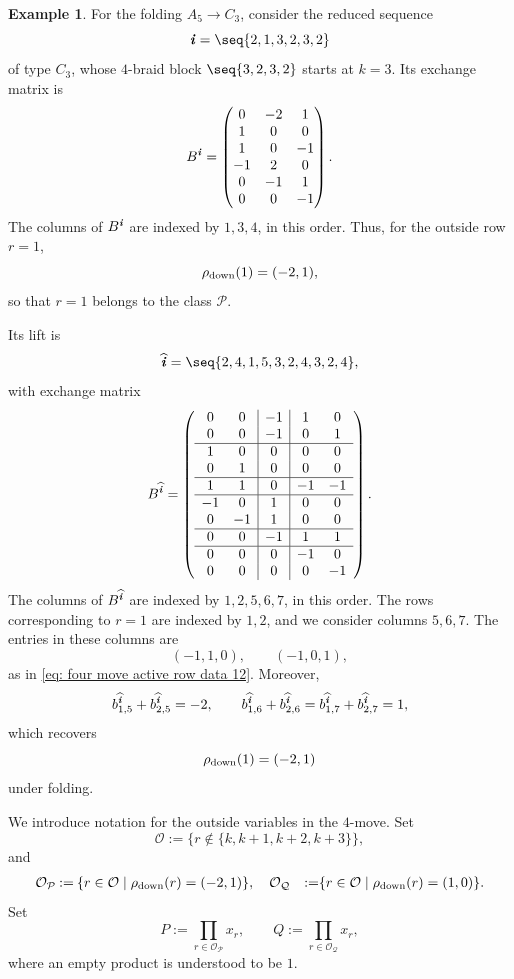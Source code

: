 \documentclass[12pt, leqno]{amsart}
\numberwithin{equation}{section}
\theoremstyle{plain}
\theoremstyle{definition}
\newtheorem{example}[lemma]{Example}
\newcommand{\seteq}{\mathbin{:=}}
\newcommand{\ii}{ \textbf{\textit{i}}}
\newcommand{\hii}{{\widehat{\ii}}}
\newcommand{\calO}{\mathcal{O}}
\newcommand{\calP}{\mathcal{P}}
\newcommand{\calQ}{\mathcal{Q}}
\begin{document}
\begin{example}\label{ex: folding and fiber}
For the folding $A_5\longrightarrow C_3$, consider the reduced sequence
\[
\ii=\seq{2,1,3,2,3,2}
\]
of type $C_3$, whose $4$-braid block $\seq{3,2,3,2}$ starts at $k=3$.
Its exchange matrix is
\[
B^\ii=
\begin{pmatrix}
0&-2&1\\
1&0&0\\
1&0&-1\\
-1&2&0\\
0&-1&1\\
0&0&-1
\end{pmatrix}.
\]
The columns of $B^\ii$ are indexed by $1,3,4$, in this order.
Thus, for the outside row $r=1$,
\[
\rho_{\rm down}(1)=(-2,1),
\]
so that $r=1$ belongs to the class $\calP$.

Its lift is
\[
\hii=\seq{2,4,1,5,3,2,4,3,2,4},
\]
with exchange matrix
\[
B^\hii=
\left(
\begin{array}{cc|c|cc}
 0& 0&-1& 1& 0\\
 0& 0&-1& 0& 1\\ \hline
 1& 0& 0& 0& 0\\
 0& 1& 0& 0& 0\\ \hline
 1& 1& 0&-1&-1\\ \hline
-1& 0& 1& 0& 0\\
 0&-1& 1& 0& 0\\ \hline
 0& 0&-1& 1& 1\\ \hline
 0& 0& 0&-1& 0\\
 0& 0& 0& 0&-1
\end{array}
\right).
\]
The columns of $B^\hii$ are indexed by $1,2,5,6,7$, in this order.
 The rows corresponding to $r=1$ are indexed by $1,2$, 
and we consider columns $5,6,7$.
The entries in these columns are
\[
(-1,1,0),\qquad (-1,0,1),
\]
as in \eqref{eq: four move active row data 12}. Moreover,
\[
b^\hii_{1,5}+b^\hii_{2,5}=-2,   \qquad   b^\hii_{1,6}+b^\hii_{2,6}   =   b^\hii_{1,7}+b^\hii_{2,7}=1,
\]
which recovers
\[
\rho_{\rm down}(1)=(-2,1)
\]
under folding.
\end{example}

We introduce notation for the outside variables in the $4$-move. Set
\[
\calO \seteq \{r\notin\{k,k+1,k+2,k+3\}\},
\]
and
\[
\begin{aligned}
\calO_{\calP} &\seteq \{r\in\calO\mid \rho_{\rm down}(r)=(-2,1)\}, \quad
\calO_{\calQ} &\seteq \{r\in\calO\mid \rho_{\rm down}(r)=(1,0)\}.
\end{aligned}
\]
Set
\[
P \seteq \prod_{r\in\calO_{\calP}}x_r, \qquad  Q \seteq \prod_{r\in\calO_{\calQ}}x_r,
\]
where an empty product is understood to be $1$.
\end{document}
